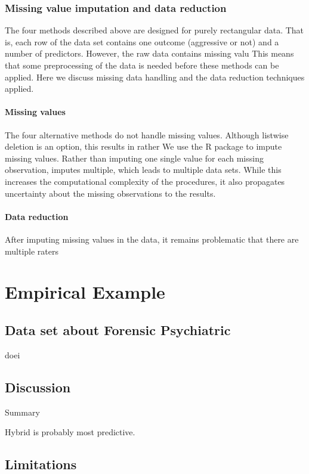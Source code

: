 \documentclass[a4paper,11pt]{article}
\begin{document}
\subsubsection{Missing value imputation and data reduction}
The four methods described above are designed for purely rectangular data.
That is, each row of the data set contains one outcome (aggressive or not) and a number of predictors.
However, the raw data contains missing valu
This means that some preprocessing of the data is needed before these methods can be applied.
Here we discuss missing data handling and the data reduction techniques applied.

\paragraph{Missing values}
The four alternative methods do not handle missing values.
Although listwise deletion is an option, this results in rather
We use the R package  \parencite{vanBuuren2011mice} to impute missing values.
Rather than imputing one single value for each missing observation,  imputes multiple, which leads to multiple data sets.
While this increases the computational complexity of the procedures, it also propagates uncertainty about the missing observations to the results.


\paragraph{Data reduction}
After imputing missing values in the data, it remains problematic that there are multiple raters


\section{Empirical Example}

\subsection{Data set about Forensic Psychiatric}
doei
\subsection{Discussion}
Summary

Hybrid is probably most predictive.

\subsection{Limitations}
\end{document}
